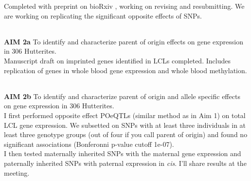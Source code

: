 \documentclass[a4paper, 11pt]{article}
\begin{document}
	Completed with preprint on bioRxiv \cite{Mozaffari:dg}, working on revising and resubmitting. We are working on replicating the significant opposite effects of SNPs.
	
 \textbf{\\AIM 2a} To identify and characterize parent of origin effects on gene expression in 306 Hutterites.\\
 
 	Manuscript draft on imprinted genes identified in LCLs completed. Includes replication of genes in whole blood gene expression and whole blood methylation. 
 
 \textbf{\\AIM 2b} To identify and characterize parent of origin and allele specific effects on gene expression in 306 Hutterites.\\ 
 	
	I first performed opposite effect POeQTLs (similar method as in Aim 1) on total LCL gene expression. We subsetted on SNPs with at least three individuals in at least three genotype groups (out of four if you call parent of origin) and found no significant associations (Bonferonni p-value cutoff 1e-07).\\
	
	I then tested maternally inherited SNPs with the maternal gene expression and paternally inherited SNPs with paternal expression in \textit{cis}. I'll share results at the meeting. \\




\end{document}
